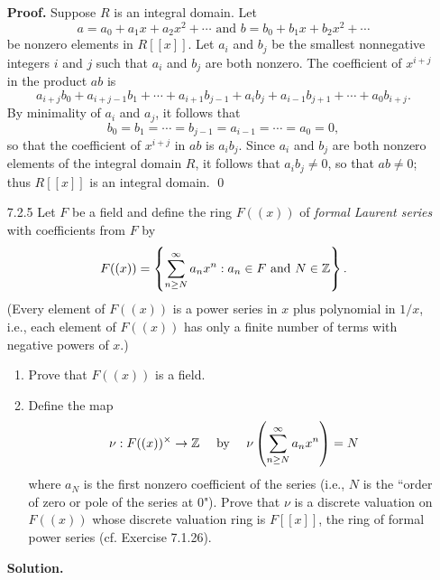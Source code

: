 \begin{enumerate}
      \textbf{Proof.} Suppose $R$ is an integral domain. Let
      $$a = a_0 + a_1x + a_2x^2 + \cdots \text{ and }
        b = b_0 + b_1x + b_2x^2 + \cdots$$
      be nonzero elements in $R[[x]]$. Let $a_i$ and $b_j$ be the smallest
      nonnegative integers $i$ and $j$ such that $a_i$ and $b_j$ are both
      nonzero. The coefficient of $x^{i + j}$ in the product $ab$ is
      $$a_{i + j}b_0 + a_{i + j- 1}b_1 + \cdots + a_{i + 1}b_{j - 1} + a_ib_j +
        a_{i - 1}b_{j + 1} + \cdots + a_0b_{i + j}.$$
      By minimality of $a_i$ and $a_j$, it follows that
      $$b_0 = b_1 = \cdots = b_{j - 1} = a_{i - 1} = \cdots = a_0 = 0,$$
      so that the coefficient of $x^{i + j}$ in $ab$ is $a_ib_j$. Since $a_i$
      and $b_j$ are both nonzero elements of the integral domain $R$, it follows
      that $a_ib_j \neq 0$, so that $ab \neq 0$; thus $R[[x]]$ is an integral
      domain. \qed
   \item[7.2.5]   Let $F$ be a field and define the ring $F((x))$ of
                  \textit{formal Laurent series} with coefficients from $F$ by
                  $$F((x)) = \left\{\sum_{n \ge N}^\infty a_nx^n : a_n \in F
                    \text{ and } N \in \mathbb{Z}\right\}.$$
                  (Every element of $F((x))$ is a power series in $x$ plus
                  polynomial in $1/x$, i.e., each element of $F((x))$ has only a
                  finite number of terms with negative powers of $x$.)
                  \begin{enumerate}
                     \item Prove that $F((x))$ is a field.
                     \item Define the map
                           $$\nu : F((x))^\times \rightarrow \mathbb{Z} \quad\text{ by }
                             \quad\nu\left(\sum_{n \ge N}^\infty
                              a_nx^n\right) = N$$
                           where $a_N$ is the first nonzero coefficient of the
                           series (i.e., $N$ is the ``order of zero or pole of
                           the series at 0"). Prove that $\nu$ is a discrete
                           valuation on $F((x))$ whose discrete valuation ring
                           is $F[[x]]$, the ring of formal power series
                           (cf. Exercise 7.1.26).
                  \end{enumerate}

      \textbf{Solution.}


\end{enumerate}
